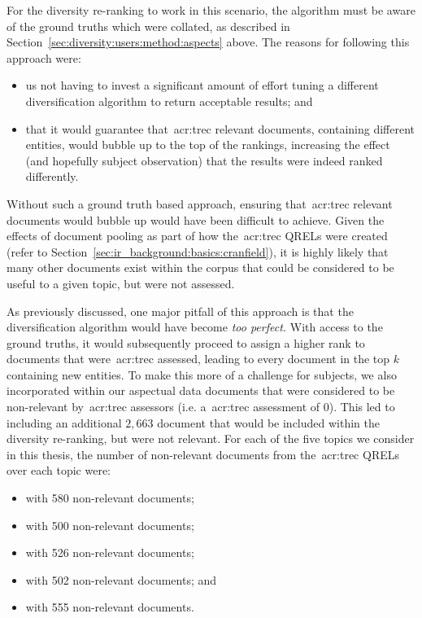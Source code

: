 For the diversity re-ranking to work in this scenario, the algorithm must be aware of the ground truths which were collated, as described in Section~\ref{sec:diversity:users:method:aspects} above. The reasons for following this approach were:

\begin{itemize}
    \item{us not having to invest a significant amount of effort tuning a different diversification algorithm to return acceptable results; and}
    \item{that it would guarantee that~\gls{acr:trec} relevant documents, containing different entities, would bubble up to the top of the rankings, increasing the effect (and hopefully subject observation) that the results were indeed ranked differently.}
\end{itemize}

Without such a ground truth based approach, ensuring that~\gls{acr:trec} relevant documents would bubble up would have been difficult to achieve. Given the effects of document pooling as part of how the~\gls{acr:trec} QRELs were created (refer to Section~\ref{sec:ir_background:basics:cranfield}), it is highly likely that many other documents exist within the corpus that could be considered to be useful to a given topic, but were not assessed.

As previously discussed, one major pitfall of this approach is that the diversification algorithm would have become \emph{too perfect.} With access to the ground truths, it would subsequently proceed to assign a higher rank to documents that were~\gls{acr:trec} assessed, leading to every document in the top $k$ containing new entities. To make this more of a challenge for subjects, we also incorporated within our aspectual data documents that were considered to be non-relevant by~\gls{acr:trec} assessors (i.e. a~\gls{acr:trec} assessment of $0$). This led to including an additional $2,663$ document that would be included within the diversity re-ranking, but were not relevant. For each of the five topics we consider in this thesis, the number of non-relevant documents from the~\gls{acr:trec} QRELs over each topic were:

\begin{itemize}
    \item{ with 580 non-relevant documents;}
    \item{ with 500 non-relevant documents;}
    \item{ with 526 non-relevant documents;}
    \item{ with 502 non-relevant documents; and}
    \item{ with 555 non-relevant documents.}
\end{itemize}

